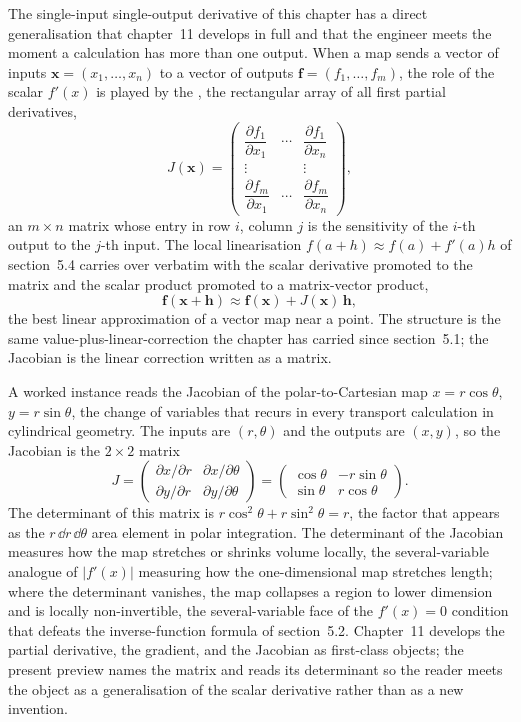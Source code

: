 The single-input single-output derivative of this chapter has a direct
generalisation that chapter~11 develops in full and that the engineer
meets the moment a calculation has more than one output. When a map
sends a vector of inputs $\mathbf{x} = (x_{1}, \ldots, x_{n})$ to a
vector of outputs $\mathbf{f} = (f_{1}, \ldots, f_{m})$, the role of the
scalar $f'(x)$ is played by the , the
rectangular array of all first partial derivatives,
\[
J(\mathbf{x}) = \begin{pmatrix}
\dfrac{\partial f_{1}}{\partial x_{1}} & \cdots &
\dfrac{\partial f_{1}}{\partial x_{n}} \\[1.2ex]
\vdots & & \vdots \\[0.6ex]
\dfrac{\partial f_{m}}{\partial x_{1}} & \cdots &
\dfrac{\partial f_{m}}{\partial x_{n}}
\end{pmatrix},
\]
an $m \times n$ matrix whose entry in row $i$, column $j$ is the
sensitivity of the $i$-th output to the $j$-th input. The local
linearisation $f(a + h) \approx f(a) + f'(a) h$ of section~5.4 carries
over verbatim with the scalar derivative promoted to the matrix and the
scalar product promoted to a matrix-vector product,
\[
\mathbf{f}(\mathbf{x} + \mathbf{h}) \approx \mathbf{f}(\mathbf{x}) +
J(\mathbf{x})\,\mathbf{h},
\]
the best linear approximation of a vector map near a point. The structure
is the same value-plus-linear-correction the chapter has carried since
section~5.1; the Jacobian is the linear correction written as a matrix.

A worked instance reads the Jacobian of the polar-to-Cartesian map
$x = r \cos\theta$, $y = r \sin\theta$, the change of variables that
recurs in every transport calculation in cylindrical geometry. The
inputs are $(r, \theta)$ and the outputs are $(x, y)$, so the Jacobian is
the $2 \times 2$ matrix
\[
J = \begin{pmatrix}
\partial x/\partial r & \partial x/\partial\theta \\
\partial y/\partial r & \partial y/\partial\theta
\end{pmatrix}
= \begin{pmatrix}
\cos\theta & -r \sin\theta \\
\sin\theta & r \cos\theta
\end{pmatrix}.
\]
The determinant of this matrix is $r \cos^{2}\theta + r \sin^{2}\theta =
r$, the factor that appears as the $r\,\dd r\,\dd\theta$ area element in
polar integration. The determinant of the Jacobian measures how the map
stretches or shrinks volume locally, the several-variable analogue of
$|f'(x)|$ measuring how the one-dimensional map stretches length; where
the determinant vanishes, the map collapses a region to lower dimension
and is locally non-invertible, the several-variable face of the
$f'(x) = 0$ condition that defeats the inverse-function formula of
section~5.2. Chapter~11 develops the partial derivative, the gradient,
and the Jacobian as first-class objects; the present preview names the
matrix and reads its determinant so the reader meets the object as a
generalisation of the scalar derivative rather than as a new invention.

